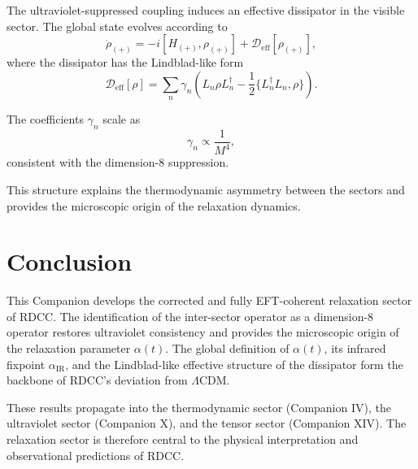 \documentclass[11pt,a4paper]{article}
\begin{document}
The ultraviolet-suppressed coupling induces an effective dissipator in the
visible sector. The global state evolves according to
\begin{equation}
\dot{\rho}_{(+)} =
- i [H_{(+)}, \rho_{(+)}]
+ \mathcal{D}_{\mathrm{eff}}[\rho_{(+)}],
\end{equation}
where the dissipator has the Lindblad-like form
\begin{equation}
\mathcal{D}_{\mathrm{eff}}[\rho]
=
\sum_{n} \gamma_n
\left(
L_n \rho L_n^\dagger
- \frac{1}{2} \{ L_n^\dagger L_n, \rho \}
\right).
\end{equation}

The coefficients $\gamma_n$ scale as
\begin{equation}
\gamma_n \propto \frac{1}{M^4},
\end{equation}
consistent with the dimension-8 suppression.

This structure explains the thermodynamic asymmetry between the sectors and
provides the microscopic origin of the relaxation dynamics.

\section{Conclusion}

This Companion develops the corrected and fully EFT-coherent relaxation sector
of RDCC. The identification of the inter-sector operator as a dimension-8
operator restores ultraviolet consistency and provides the microscopic origin
of the relaxation parameter $\alpha(t)$. The global definition of $\alpha(t)$,
its infrared fixpoint $\alpha_{\mathrm{IR}}$, and the Lindblad-like effective
structure of the dissipator form the backbone of RDCC's deviation from
$\Lambda$CDM.

These results propagate into the thermodynamic sector (Companion IV), the
ultraviolet sector (Companion X), and the tensor sector (Companion XIV). The
relaxation sector is therefore central to the physical interpretation and
observational predictions of RDCC.
\end{document}
